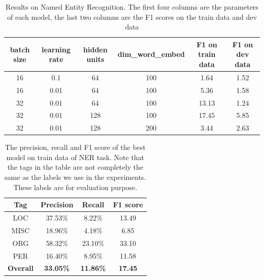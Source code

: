 \documentclass[11pt,a4paper]{article}
\begin{document}
% 
\begin{table}[]
\centering
\caption{Results on Named Entity Recognition. The first four columns are the parameters of each model, the last two columns are the F1 scores on the train data and dev data}
\label{f1table}
\begin{tabular}{@{}cccc|cc@{}}
\toprule
batch size & learning rate & hidden units & dim\_word\_embed & F1 on train data & F1 on dev data \\ \midrule
16         & 0.1           & 64           & 100              & 1.64             & 1.52           \\
16         & 0.01          & 64           & 100              & 5.36             & 1.58           \\
32         & 0.01          & 64           & 100              & 13.13            & 1.24           \\
32         & 0.01          & 128          & 100              & 17.45            & 5.85           \\
32         & 0.01          & 128          & 200              & 3.44             & 2.63           \\ \bottomrule
\end{tabular}
\end{table}

\begin{table}[]
\centering
\caption{The precision, recall and F1 score of the best model on train data of NER task. Note that the tags in the table are not completely the same as the labels we use in the experiments. These labels are for evaluation purpose.}
\label{precision}
\begin{tabular}{@{}cccc@{}}
\toprule
Tag            & Precision        & Recall           & F1 score       \\ \midrule
LOC              & 37.53\%          & 8.22\%           & 13.49          \\ \midrule
MISC             & 18.96\%          & 4.18\%           & 6.85           \\ \midrule
ORG              & 58.32\%          & 23.10\%          & 33.10          \\ \midrule
PER              & 16.40\%          & 8.95\%           & 11.58          \\ \midrule
\textbf{Overall} & \textbf{33.05\%} & \textbf{11.86\%} & \textbf{17.45} \\ \bottomrule
\end{tabular}
\end{table}
\end{document}
